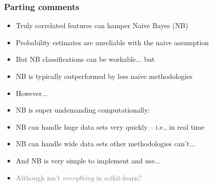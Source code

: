 \documentclass[xcolor={dvipsnames}]{beamer}
\begin{document}
\frame
{
 \frametitle{Parting comments}

\begin{itemize}
\item Truly correlated features can hamper Naive Bayes (NB)
\item<2-> Probability estimates are unreliable with the naive assumption
\item<3-> But NB classifications can be workable... but
\item<4-> NB is typically outperformed by less naive methodologies
\item<5->[] However...
\item<6-> NB is super undemanding computationally:
\item<7->[] NB can handle huge data sets very quickly -- i.e., in real time
\item<8->[] NB can handle wide data sets other methodologies can't... 
\item<9-> And NB is very simple to implement and use...
\item<10->[]  \textcolor{gray}{Although isn't \emph{everything} in scikit-learn?}
\end{itemize}

}
\end{document}
